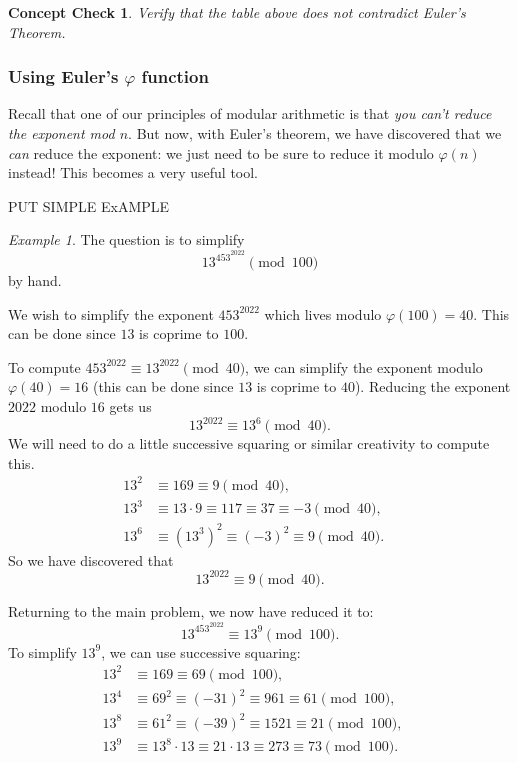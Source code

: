 \documentclass{article}
\theoremstyle{plain}
\newtheorem{checkin}[theorem]{Concept Check}
\theoremstyle{definition}
\theoremstyle{remark}
\newtheorem{example}[theorem]{Example}
\numberwithin{theorem}{section}
\begin{document}
\begin{checkin}
Verify that the table above does not contradict Euler's Theorem.
\end{checkin}



\subsubsection{Using Euler's $\varphi$ function}


Recall that one of our principles of modular arithmetic is that \emph{you can't reduce the exponent mod $n$}.  But now, with Euler's theorem, we have discovered that we \emph{can} reduce the exponent:  we just need to be sure to reduce it modulo $\varphi(n)$ instead!  This becomes a very useful tool.


PUT SIMPLE ExAMPLE

\begin{example}
    

The question is to simplify
\[
	13^{453^{2022}} \pmod{100}
\]
by hand.

We wish to simplify the exponent $453^{2022}$ which lives modulo $\varphi(100)=40$.  This can be done since $13$ is coprime to $100$.

To compute $453^{2022} \equiv 13^{2022} \pmod{40}$, we can simplify the exponent modulo $\varphi(40)=16$ (this can be done since $13$ is coprime to $40$).  Reducing the exponent $2022$ modulo $16$ gets us
\[
	13^{2022} \equiv 13^6 \pmod{40}.
\]
We will need to do a little successive squaring or similar creativity to compute this.
\begin{align*}
	13^2 &\equiv 169 \equiv 9 \pmod{40}, \quad \\
	13^3 &\equiv 13 \cdot 9 \equiv 117 \equiv 37 \equiv -3 \pmod{40}, \quad \\
	13^6 &\equiv (13^3)^2 \equiv (-3)^2 \equiv 9 \pmod{40}.
\end{align*}
So we have discovered that
\[
	13^{2022} \equiv 9 \pmod{40}.
\]

Returning to the main problem, we now have reduced it to:
\[
	13^{453^{2022}} \equiv 13^9 \pmod{100}.
\]
To simplify $13^9$, we can use successive squaring:
\begin{align*}
	13^2 &\equiv 169 \equiv 69 \pmod{100}, \quad \\
	13^4 &\equiv 69^2 \equiv (-31)^2 \equiv 961 \equiv 61 \pmod{100}, \quad \\
	13^8 &\equiv 61^2 \equiv (-39)^2 \equiv 1521 \equiv 21 \pmod{100}, \quad \\
	13^9 &\equiv 13^8 \cdot 13 \equiv 21 \cdot 13 \equiv 273 \equiv 73 \pmod{100}.
\end{align*}

\end{example}
\end{document}
